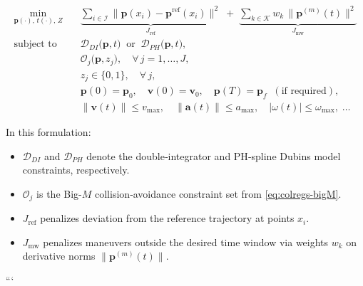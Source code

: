 \begin{equation}
\label{eq:minmpc-compact}
\begin{aligned}
\min_{\mathbf{p}(\cdot),\,t(\cdot),\,Z}
\quad & 
\underbrace{\sum_{i \in \mathcal{I}}
         \bigl\|\mathbf{p}(x_i) - \mathbf{p}^{\mathrm{ref}}(x_i)\bigr\|^2}_{J_{\mathrm{ref}}}
\;+\;
\underbrace{\sum_{k \in \mathcal{K}}
         w_k\,\bigl\|\mathbf{p}^{(m)}(t)\bigr\|^2}_{J_{\mathrm{mw}}}
\\[1ex]
\text{subject to}\quad
& \mathcal{D}_{DI}\bigl(\mathbf{p},t\bigr)
\;\;\text{or}\;\;
  \mathcal{D}_{PH}\bigl(\mathbf{p},t\bigr),
\\[0.75ex]
& \mathcal{O}_j\bigl(\mathbf{p},z_j\bigr),
\quad \forall\,j=1,\dots,J,
\\[0.5ex]
& z_j \in \{0,1\}, \quad \forall\,j,
\\[0.5ex]
& \mathbf{p}(0) = \mathbf{p}_0,\quad \mathbf{v}(0)=\mathbf{v}_0,
\quad \mathbf{p}(T) = \mathbf{p}_f\;\;(\text{if required}),
\\[0.5ex]
& \|\mathbf{v}(t)\|\le v_{\max},\quad 
  \|\mathbf{a}(t)\|\le a_{\max},\quad
  |\omega(t)|\le \omega_{\max},\;\dots
\end{aligned}
\end{equation}

In this formulation:
\begin{itemize}
  \item $\mathcal{D}_{DI}$ and $\mathcal{D}_{PH}$ denote the double‐integrator and PH‐spline Dubins model constraints, respectively.
  \item $\mathcal{O}_j$ is the Big-$M$ collision‐avoidance constraint set from \eqref{eq:colregs-bigM}.
  \item $J_{\mathrm{ref}}$ penalizes deviation from the reference trajectory at points $x_i$.
  \item $J_{\mathrm{mw}}$ penalizes maneuvers outside the desired time window via weights $w_k$ on derivative norms $\|\mathbf{p}^{(m)}(t)\|$.
\end{itemize}
```
